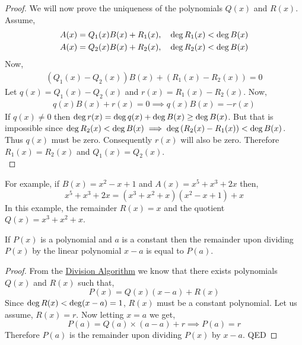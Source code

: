 \begin{proof}
    We will now prove the uniqueness of the polynomials $Q(x)$ and $R(x)$. Assume,
    \begin{align*}
        & A(x) = Q_{1}(x)B(x) + R_{1}(x), \quad \operatorname{deg} R_{1}(x) < \operatorname{deg} B(x) \\
        & A(x) = Q_{2}(x)B(x) + R_{2}(x), \quad \operatorname{deg} R_{2}(x) < \operatorname{deg} B(x)
    \end{align*}
    Now,
    \begin{align*}
                 \left(Q_{1}(x) - Q_{2}(x)\right)B(x) + \left(R_{1}(x) - R_{2}(x)\right) = 0
    \end{align*}
    Let $q(x) = Q_{1}(x) - Q_{2}(x)$ and $r(x) = R_{1}(x) - R_{2}(x)$. Now,
    \begin{align*}
                 q(x)B(x) + r(x) = 0 
        \implies q(x)B(x) = -r(x)
    \end{align*}
    If $q(x)\neq 0$ then $\operatorname{deg} r(x) = \operatorname{deg} q(x) + \operatorname{deg} B(x) \geq \operatorname{deg} B(x)$. But that is impossible since 
    $\operatorname{deg} R_{2}(x) < \operatorname{deg} B(x) \implies \operatorname{deg} \left(R_{2}(x) - R_{1}(x)\right) < \operatorname{deg} B(x)$. Thus $q(x)$ must be zero. 
    Consequently $r(x)$ will also be zero. Therefore $R_{1}(x)=R_{2}(x)$ and $Q_{1}(x)=Q_{2}(x)$. \\
\end{proof}

For example, if $B(x)= x^{2}-x+1$ and $A(x)=x^{5}+x^{3}+2x$ then,
\[
    x^{5}+x^{3}+2x = \left(x^{3}+x^{2}+x\right) \left(x^{2}-x+1\right) +x
\]
In this example, the remainder $R(x)=x$ and the quotient $Q(x)=x^{3}+x^{2}+x$. \\

\begin{theorem}\label{thm:remainder-theorem}
    If $P(x)$ is a polynomial and $a$ is a constant then the remainder upon dividing $P(x)$ by the linear 
    polynomial $x-a$ is equal to $P(a)$.
\end{theorem}
\begin{proof}
    From the \hyperref[thm:division-algorithm]{Division Algorithm} we know that there exists polynomials $Q(x)$ and $R(x)$ 
    such that,
    \[
        P(x) = Q(x)\left(x-a\right) + R(x)
    \]
    Since $\operatorname{deg} R(x) < \operatorname{deg} (x-a)=1$, $R(x)$ must be a constant polynomial. Let us assume, $R(x)=r$. 
    Now letting $x=a$ we get,
    \[
        P(a) = Q(a)\times (a-a) + r \implies P(a) = r
    \]
    Therefore $P(a)$ is the remainder upon dividing $P(x)$ by $x-a$. \textsf{QED}
\end{proof}

